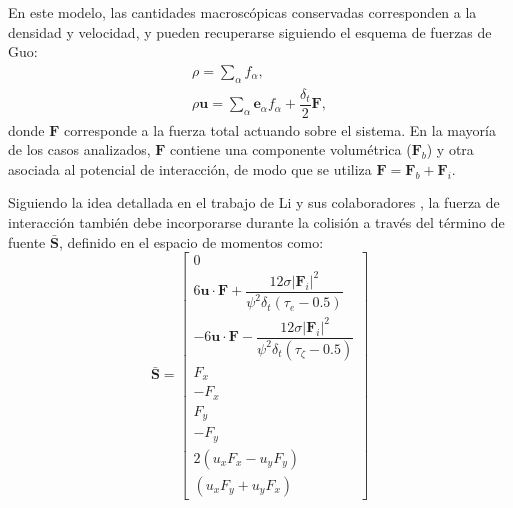 En este modelo, las cantidades macrosc\'opicas conservadas corresponden a la densidad y velocidad, y pueden recuperarse siguiendo el esquema de fuerzas de Guo:
\begin{equation}
	\begin{gathered}
		\rho = \sum_{\alpha} f_{\alpha}, \\
		\rho \bm{u} = \sum_{\alpha} \bm{e}_{\alpha} f_{\alpha} + \dfrac{\delta_t}{2} \bm{F},
	\end{gathered}
\end{equation}
donde $\bm{F}$ corresponde a la fuerza total actuando sobre el sistema. En la mayor\'ia de los casos analizados, $\bm{F}$ contiene una componente volum\'etrica ($\bm{F}_b$) y otra asociada al potencial de interacci\'on, de modo que se utiliza $\bm{F} = \bm{F}_b + \bm{F}_i$.

Siguiendo la idea detallada en el trabajo de Li y sus colaboradores \cite{li_forcing_2012}, la fuerza de interacci\'on tambi\'en debe incorporarse durante la colisi\'on a trav\'es del t\'ermino de fuente $\bar{\bm{S}}$, definido en el espacio de momentos como:
\begin{equation}
 \bar{\bm{S}} = 
 \left[ 
 	\begin{array}{c} 
 		0	\\
 		6 \bm{u} \cdot \bm{F} + \dfrac{12\sigma |\bm{F}_i|^2}{\psi^2 \delta_t (\tau_e-0.5)} \\
 		-6 \bm{u} \cdot \bm{F} - \dfrac{12\sigma |\bm{F}_i|^2}{\psi^2 \delta_t (\tau_{\zeta}-0.5)} \\
 		F_x \\
 		-F_x \\
 		F_y \\
 		-F_y \\
 		2(u_xF_x - u_yF_y) \\
 		(u_xF_y + u_yF_x)
 	\end{array} 
 \right]
 \label{eq:s_li}
\end{equation}

